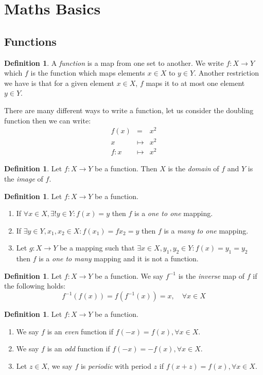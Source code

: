 \documentclass[11pt]{article}
\theoremstyle{definition}
\newtheorem{defn}[prop]{Definition}
\newcommand{\brac}[1]{\left(#1\right)}
\begin{document}
\tableofcontents
\pagebreak
\section{Maths Basics}
\subsection{Functions}
	\begin{defn}
		A \emph{function} is a map from one set to another. We write $f:X\rightarrow Y$ which $f$ is the function which maps elements $x\in X$ to $y\in Y$. Another restriction we have is that for a given element $x\in X$, $f$ maps it to at most one element $y\in Y$.
	\end{defn}
	
	There are many different ways to write a function, let us consider the doubling function then we can write:
	\begin{eqnarray*}
		f(x) &=& x^2\\
		x &\mapsto & x^2\\
		f:x&\mapsto & x^2
	\end{eqnarray*}
	\begin{defn}
		Let $f:X\rightarrow Y$ be a function. Then $X$ is the \emph{domain} of $f$ and $Y$ is the \emph{image} of $f$.
	\end{defn}
	\begin{defn}
		Let $f:X\rightarrow Y$ be a function.
		\begin{enumerate}
		\item If $\forall x\in X, \exists ! y\in Y : f\brac{x} = y$ then $f$ is a \emph{one to one} mapping.
		\item If $\exists y\in Y, x_1, x_2 \in X : f\brac{x_1} = f{x_2} = y$ then $f$ is a \emph{many to one} mapping.
		\item Let $g: X \rightarrow Y$ be a mapping such that $\exists x\in X, y_1,y_2\in Y : f(x) = y_1 = y_2$ then $f$ is a \emph{one to many} mapping and it is not a function.
		\end{enumerate}
	\end{defn}
	\begin{defn}
		Let $f:X\rightarrow Y$ be a function. We say $f^{-1}$ is the \emph{inverse} map of $f$ if the following holds:
		$$ f^{-1}\brac{f\brac{x}} = f\brac{f^{-1}\brac{x}} = x, \quad \forall x\in X$$
	\end{defn}
	\begin{defn}
		Let $f: X\rightarrow Y$ be a function. 
		\begin{enumerate}
		\item We say $f$ is an \emph{even} function if $f\brac{-x} = f\brac{x},\forall x\in X$.
		\item We say $f$ is an \emph{odd} function if $f\brac{-x} = -f\brac{x},\forall x\in X$.
		\item Let $z\in X$, we say $f$ is \emph{periodic} with period $z$ if $ f\brac{x+z} = f\brac{x}, \forall x \in X$.
		\end{enumerate}
	\end{defn}
\end{document}
